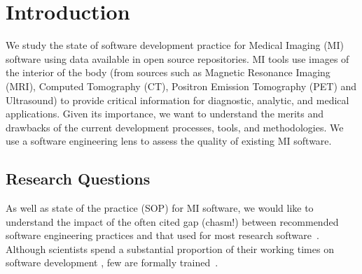\documentclass[final, 12pt, 3p, times]{elsarticle}
\begin{document}

\section{Introduction} \label{ch_intro}

We study the state of software development practice for Medical Imaging
(MI) software using data available in open source repositories.  MI tools use
images of the interior of the body (from sources such as Magnetic Resonance
Imaging (MRI), Computed Tomography (CT), Positron Emission Tomography (PET) and
Ultrasound) to provide critical information for diagnostic, analytic, and medical
applications. Given its importance, we want to understand the merits and
drawbacks of the current development processes, tools, and methodologies. We
use a software engineering lens to assess the quality of existing MI software.

\subsection{Research Questions} \label{sec_motivation}

As well as state of the practice (SOP) for MI software, we would like to
understand the impact of the often cited gap (chasm!) between recommended
software engineering practices and that used for most research 
software~\cite{Storer2017}. Although scientists spend
a substantial proportion of their working times on software development
\cite{Hannay2009, Prabhu2011}, few are formally trained~\cite{Hannay2009}.
\end{document}
